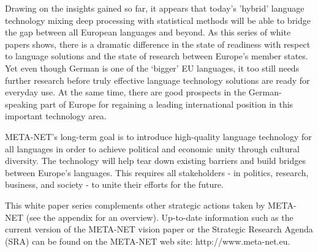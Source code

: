 \begin{multicols}{2}

    Drawing on the insights gained so far, it appears that today’s 'hybrid' language technology mixing deep processing with statistical methods will be able to bridge the gap between all European languages and beyond. As this series of white papers shows, there is a dramatic difference in the state of readiness with respect to language solutions and the state of research between Europe’s member states. Yet even though German is one of the ‘bigger’ EU languages, it too still needs further research before truly effective language technology solutions are ready for everyday use. At the same time, there are good prospects in the German-speaking part of Europe for regaining a leading international position in this important technology area. 

    META-NET’s long-term goal is to introduce high-quality language technology for all languages in order to achieve political and economic unity through cultural diversity. The technology will help tear down existing barriers and build bridges between Europe’s languages. This requires all stakeholders - in politics, research, business, and society - to unite their efforts for the future.

    This white paper series complements other strategic actions taken by META-NET (see the appendix for an overview). Up-to-date information such as the current version of the META-NET vision paper \cite{Meta1} or the Strategic Research Agenda (SRA) can be found on the META-NET web site: http://www.meta-net.eu.
\end{multicols}

\clearpage



